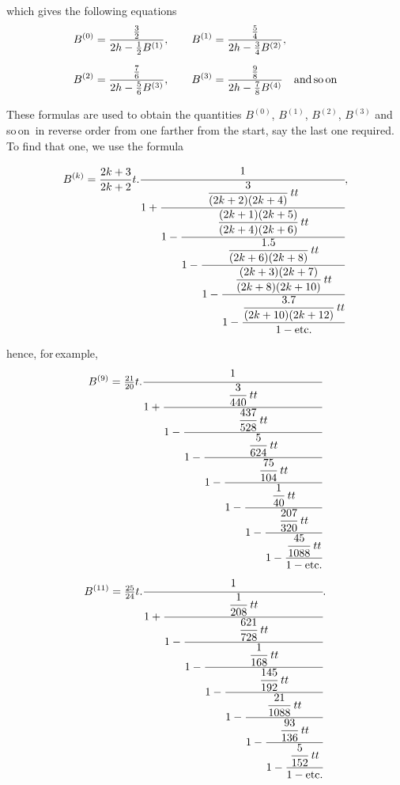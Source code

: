 %
\noindent which gives the following equations
\[
\begin{aligned}
B^{(0)}&=\frac{\frac{3}{2}}{2h-\frac{1}{2}B^{(1)}},\qquad
B^{(1)}=\frac{\frac{5}{4}}{2h-\frac{3}{4}B^{(2)}},\\[6pt]
B^{(2)}&=\frac{\frac{7}{6}}{2h-\frac{5}{6}B^{(3)}},\qquad
B^{(3)}=\frac{\frac{9}{8}}{2h-\frac{7}{8}B^{(4)}}\quad\text{and\,so\,on}
\end{aligned}
\]

These formulas are used to obtain the quantities $B^{(0)}$, $B^{(1)}$,
$B^{(2)}$, $B^{(3)}$ and\,so\,on\ in reverse order from one farther from the
start, say the last one required. To find that one, we use
the formula

\[
B^{(k)}=\frac{2k+3}{2k+2}t\mathord{.}\cfrac{1}{1+\cfrac{\dfrac{3}{(2k+2)(2k+4)}\,tt}{1-\cfrac{\dfrac{(2k+1)(2k+5)}{(2k+4)(2k+6)}\,tt}{1-\cfrac{\dfrac{1.5}{(2k+6)(2k+8)}\,tt}{1-\cfrac{\dfrac{(2k+3)(2k+7)}{(2k+8)(2k+10)}\,tt}{1-\cfrac{\dfrac{3.7}{(2k+10)(2k+12)}\,tt}{1-\text{etc.}}}}}}},
\]

\noindent hence, for\,example,
\[
B^{(9)}=\tfrac{21}{20}t\mathord{.}\cfrac{1}{1+\cfrac{\dfrac{3}{440}\,tt}{1-\cfrac{\dfrac{437}{528}\,tt}{1-\cfrac{\dfrac{5}{624}\,tt}{1-\cfrac{\dfrac{75}{104}\,tt}{1-\cfrac{\dfrac{1}{40}\,tt}{1-\cfrac{\dfrac{207}{320}\,tt}{1-\cfrac{\dfrac{45}{1088}\,tt}{1-\text{etc.}}}}}}}}}
\]
\[
B^{(11)}=\tfrac{25}{24}t\mathord{.}\cfrac{1}{1+\cfrac{\dfrac{1}{208}\,tt}{1-\cfrac{\dfrac{621}{728}\,tt}{1-\cfrac{\dfrac{1}{168}\,tt}{1-\cfrac{\dfrac{145}{192}\,tt}{1-\cfrac{\dfrac{21}{1088}\,tt}{1-\cfrac{\dfrac{93}{136}\,tt}{1-\cfrac{\dfrac{5}{152}\,tt}{1-\text{etc.}}}}}}}}}.
\]
